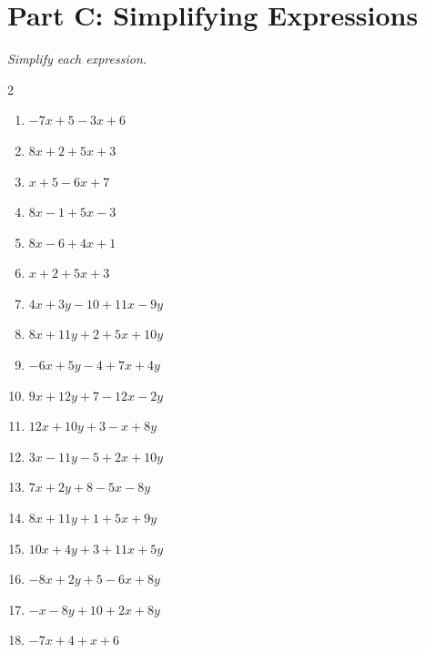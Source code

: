 \documentclass[11pt]{article}
\begin{document}
\section*{Part C: Simplifying Expressions}
\noindent\textit{Simplify each expression.}
\begin{multicols}{2}
\begin{enumerate}
  \item $-7x + 5 - 3x + 6$
  \vspace{1.1cm}
  \item $8x + 2 + 5x + 3$
  \vspace{1.1cm}
  \item $x + 5 - 6x + 7$
  \vspace{1.1cm}
  \item $8x - 1 + 5x - 3$
  \vspace{1.1cm}
  \item $8x - 6 + 4x + 1$
  \vspace{1.1cm}
  \item $x + 2 + 5x + 3$
  \vspace{1.1cm}
  \item $4x + 3y - 10 + 11x - 9y$
  \vspace{1.1cm}
  \item $8x + 11y + 2 + 5x + 10y$
  \vspace{1.1cm}
  \item $-6x + 5y - 4 + 7x + 4y$
  \vspace{1.1cm}
  \item $9x + 12y + 7 - 12x - 2y$
  \vspace{1.1cm}
  \item $12x + 10y + 3 - x + 8y$
  \vspace{1.1cm}
  \item $3x - 11y - 5 + 2x + 10y$
  \vspace{1.1cm}
  \item $7x + 2y + 8 - 5x - 8y$
  \vspace{1.1cm}
  \item $8x + 11y + 1 + 5x + 9y$
  \vspace{1.1cm}
  \item $10x + 4y + 3 + 11x + 5y$
  \vspace{1.1cm}
  \item $-8x + 2y + 5 - 6x + 8y$
  \vspace{1.1cm}
  \item $-x - 8y + 10 + 2x + 8y$
  \vspace{1.1cm}
  \item $-7x + 4 + x + 6$

\end{enumerate}
\end{multicols}
\end{document}

